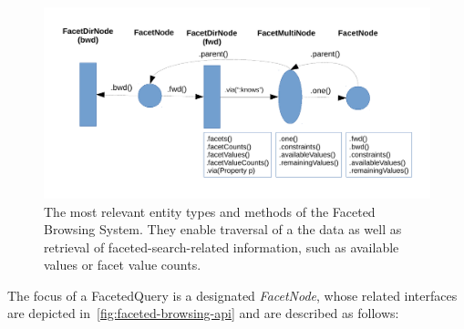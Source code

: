 \begin{figure}
\centering
\includegraphics[width=\textwidth]{images/NodeModel}
\caption{The most relevant entity types and methods of the Faceted Browsing System. They enable traversal of a the data as well as retrieval of faceted-search-related information, such as available values or facet value counts.}
\label{fig:faceted-browsing-api}
\end{figure}
The focus of a FacetedQuery is a designated \emph{FacetNode}, whose related interfaces are depicted in~\autoref{fig:faceted-browsing-api} and are described as follows:
